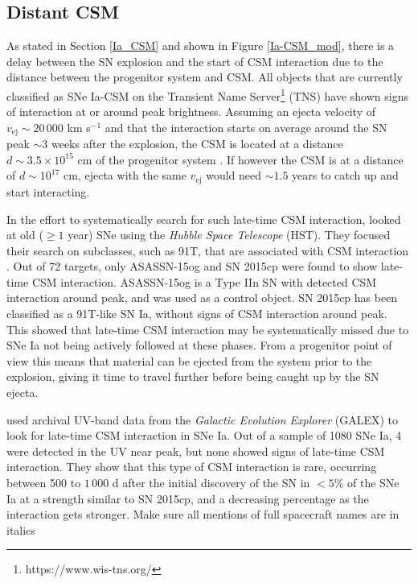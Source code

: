 \documentclass[a4paper,oneside,12pt, class=Latex/Classes/PhDthesisPSnPDF, crop=false]{standalone}
\begin{document}
\subsection{Distant CSM}
As stated in Section \ref{Ia_CSM} and shown in Figure \ref{Ia-CSM_mod}, there is a delay between the SN explosion and the start of CSM interaction due to the distance between the progenitor system and CSM. All objects that are currently classified as SNe Ia-CSM on the Transient Name Server\footnote{https://www.wis-tns.org/} (TNS) have shown signs of interaction at or around peak brightness. Assuming an ejecta velocity of $v_\text{ej} \sim 20\,000$ km s$^{-1}$ and that the interaction starts on average around the SN peak $\sim3$ weeks after the explosion, the CSM is located at a distance $d\sim3.5\times10^{15}$ cm of the progenitor system \citep{Ia-CSM_BTS}. If however the CSM is at a distance of $d\sim10^{17}$ cm, ejecta with the same $v_\text{ej}$ would need $\sim1.5$ years to catch up and start interacting.

In the effort to systematically search for such late-time CSM interaction, \citet{2015cp} looked at old ($\geq1$ year) SNe using the \textit{Hubble Space Telescope} (HST). They focused their search on subclasses, such as 91T, that are associated with CSM interaction \citep{Ia-CSM_and_91T_connection}. Out of 72 targets, only ASASSN-15og and SN 2015cp were found to show late-time CSM interaction. ASASSN-15og is a Type IIn SN with detected CSM interaction around peak, and was used as a control object. SN 2015cp has been classified as a 91T-like SN Ia, without signs of CSM interaction around peak. This showed that late-time CSM interaction may be systematically missed due to SNe Ia not being actively followed at these phases. From a progenitor point of view this means that material can be ejected from the system prior to the explosion, giving it time to travel further before being caught up by the SN ejecta.

\citet{GALEX_Late_CSM} used archival UV-band data from the \textit{Galactic Evolution Explorer} (GALEX) to look for late-time CSM interaction in SNe Ia. Out of a sample of 1080 SNe Ia, 4 were detected in the UV near peak, but none showed signs of late-time CSM interaction. They show that this type of CSM interaction is rare, occurring between 500 to $1\,000$ d after the initial discovery of the SN in $<5$\% of the SNe Ia at a strength similar to SN 2015cp, and a decreasing percentage as the interaction gets stronger. \color{red} Make sure all mentions of full spacecraft names are in italics \color{black}
\end{document}
